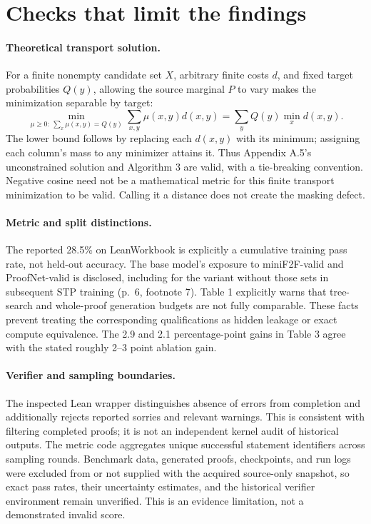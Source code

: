 \documentclass[10pt]{article}
\begin{document}
\section*{Checks that limit the findings}
\paragraph*{Theoretical transport solution.}\mbox{}\par
For a finite nonempty candidate set \(X\), arbitrary finite costs \(d\), and fixed target probabilities \(Q(y)\), allowing the source marginal \(P\) to vary makes the minimization separable by target: \[\min_{\mu\ge0:\ \sum_x\mu(x,y)=Q(y)}
\sum_{x,y}\mu(x,y)d(x,y)
=\sum_y Q(y)\min_x d(x,y).\] The lower bound follows by replacing each \(d(x,y)\) with its minimum; assigning each column’s mass to any minimizer attains it. Thus Appendix A.5’s unconstrained solution and Algorithm 3 are valid, with a tie-breaking convention. Negative cosine need not be a mathematical metric for this finite transport minimization to be valid. Calling it a distance does not create the masking defect.\par
\paragraph*{Metric and split distinctions.}\mbox{}\par
The reported 28.5\% on LeanWorkbook is explicitly a cumulative training pass rate, not held-out accuracy. The base model’s exposure to miniF2F-valid and ProofNet-valid is disclosed, including for the variant without those sets in subsequent STP training (p. 6, footnote 7). Table 1 explicitly warns that tree-search and whole-proof generation budgets are not fully comparable. These facts prevent treating the corresponding qualifications as hidden leakage or exact compute equivalence. The 2.9 and 2.1 percentage-point gains in Table 3 agree with the stated roughly 2–3 point ablation gain.\par
\paragraph*{Verifier and sampling boundaries.}\mbox{}\par
The inspected Lean wrapper distinguishes absence of errors from completion and additionally rejects reported sorries and relevant warnings. This is consistent with filtering completed proofs; it is not an independent kernel audit of historical outputs. The metric code aggregates unique successful statement identifiers across sampling rounds. Benchmark data, generated proofs, checkpoints, and run logs were excluded from or not supplied with the acquired source-only snapshot, so exact pass rates, their uncertainty estimates, and the historical verifier environment remain unverified. This is an evidence limitation, not a demonstrated invalid score.\par
\end{document}
